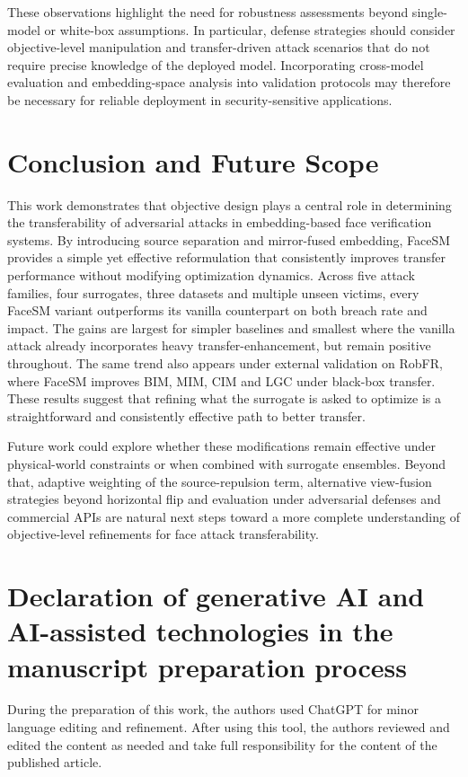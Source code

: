 \documentclass[a4paper,fleqn]{cas-dc}
\begin{document}
These observations highlight the need for robustness assessments beyond single-model or white-box assumptions. In particular, defense strategies should consider objective-level manipulation and transfer-driven attack scenarios that do not require precise knowledge of the deployed model. Incorporating cross-model evaluation and embedding-space analysis into validation protocols may therefore be necessary for reliable deployment in security-sensitive applications.

\section{Conclusion and Future Scope}
This work demonstrates that objective design plays a central role in determining the transferability of adversarial attacks in embedding-based face verification systems. By introducing source separation and mirror-fused embedding, FaceSM provides a simple yet effective reformulation that consistently improves transfer performance without modifying optimization dynamics. Across five attack families, four surrogates, three datasets and multiple unseen victims, every FaceSM variant outperforms its vanilla counterpart on both breach rate and impact. The gains are largest for simpler baselines and smallest where the vanilla attack already incorporates heavy transfer-enhancement, but remain positive throughout. The same trend also appears under external validation on RobFR, where FaceSM improves BIM, MIM, CIM and LGC under black-box transfer. These results suggest that refining what the surrogate is asked to optimize is a straightforward and consistently effective path to better transfer. 

Future work could explore whether these modifications remain effective under physical-world constraints or when combined with surrogate ensembles. Beyond that, adaptive weighting of the source-repulsion term, alternative view-fusion strategies beyond horizontal flip and evaluation under adversarial defenses and commercial APIs are natural next steps toward a more complete understanding of objective-level refinements for face attack transferability.

\section{Declaration of generative AI and AI-assisted technologies in the manuscript preparation process}
During the preparation of this work, the authors used ChatGPT for minor language editing and refinement. After using this tool, the authors reviewed and edited the content as needed and take full responsibility for the content of the published article.
\end{document}

